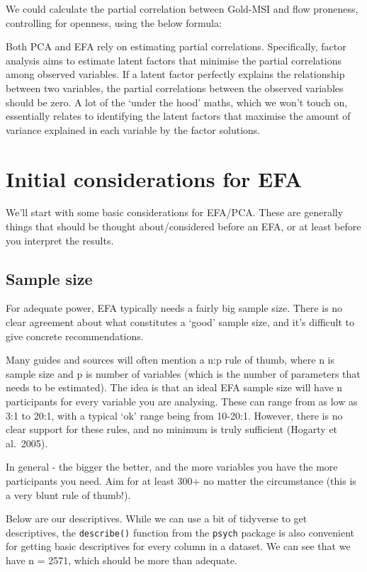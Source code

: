 \documentclass[
]{book}
\begin{document}
We could calculate the partial correlation between Gold-MSI and flow proneness, controlling for openness, using the below formula:

Both PCA and EFA rely on estimating partial correlations. Specifically, factor analysis aims to estimate latent factors that minimise the partial correlations among observed variables. If a latent factor perfectly explains the relationship between two variables, the partial correlations between the observed variables should be zero. A lot of the `under the hood' maths, which we won't touch on, essentially relates to identifying the latent factors that maximise the amount of variance explained in each variable by the factor solutions.

\hypertarget{initial-considerations-for-efa}{%
\section{Initial considerations for EFA}\label{initial-considerations-for-efa}}

We'll start with some basic considerations for EFA/PCA. These are generally things that should be thought about/considered before an EFA, or at least before you interpret the results.

\hypertarget{sample-size}{%
\subsection{Sample size}\label{sample-size}}

For adequate power, EFA typically needs a fairly big sample size. There is no clear agreement about what constitutes a `good' sample size, and it's difficult to give concrete recommendations.

Many guides and sources will often mention a n:p rule of thumb, where n is sample size and p is number of variables (which is the number of parameters that needs to be estimated). The idea is that an ideal EFA sample size will have n participants for every variable you are analysing. These can range from as low as 3:1 to 20:1, with a typical `ok' range being from 10-20:1. However, there is no clear support for these rules, and no minimum is truly sufficient (Hogarty et al.~2005).

In general - the bigger the better, and the more variables you have the more participants you need. Aim for at least 300+ no matter the circumstance (this is a very blunt rule of thumb!).

Below are our descriptives. While we can use a bit of tidyverse to get descriptives, the \texttt{describe()} function from the \texttt{psych} package is also convenient for getting basic descriptives for every column in a dataset. We can see that we have n = 2571, which should be more than adequate.
\end{document}
